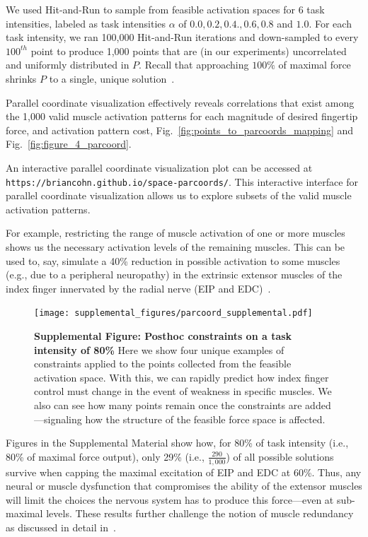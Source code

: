 \documentclass[9pt,twocolumn,twoside,lineno]{pnas-new}
\begin{document}
We used Hit-and-Run to sample from feasible activation spaces for 6 task intensities, labeled as task intensities $\alpha$ of $0.0, 0.2, 0.4., 0.6, 0.8$ and $1.0$.
For each task intensity, we ran 100,000 Hit-and-Run iterations and down-sampled to every $100^{th}$ point to produce 1,000 points that are (in our experiments) uncorrelated and uniformly distributed in $P$.
Recall that approaching $100\%$ of maximal force shrinks $P$ to a single, unique solution~\cite{Valero-Cuevas1998Large
}.




Parallel coordinate visualization effectively reveals correlations that exist among the 1,000 valid muscle activation patterns for each magnitude of desired fingertip force, and activation pattern cost, Fig.~\ref{fig:points_to_parcoords_mapping} and Fig.~\ref{fig:figure_4_parcoord}.


An interactive parallel coordinate visualization plot can be accessed at \texttt{https://briancohn.github.io/space-parcoords/}. This interactive interface for parallel coordinate visualization allows us to explore subsets of the valid muscle activation patterns.

For example, restricting the range of muscle activation of one or more muscles shows us the necessary activation levels of the remaining muscles.
This can be used to, say, simulate a 40\% reduction in possible activation to some muscles (e.g., due to a peripheral neuropathy) in the extrinsic extensor muscles of the index finger innervated by the radial nerve (EIP and EDC)~\cite{valero2000quantification}.

\begin{figure}[p]
 \centering
 \texttt{[image: supplemental\_figures/parcoord\_supplemental.pdf]}
 \caption{\textbf{Supplemental Figure: Posthoc constraints on a task intensity of 80\%} Here we show four unique examples of constraints applied to the points collected from the feasible activation space. With this, we can rapidly predict how index finger control must change in the event of weakness in specific muscles. We also can see how many points remain once the constraints are added—signaling how the structure of the feasible force space is affected.}
  \label{fig:parcoord_supplemental}
\end{figure}

Figures in the Supplemental Material show how, for 80\% of task intensity (i.e., 80\% of maximal force output), only 29\% (i.e., $\frac{290}{1,000}$) of all possible solutions survive when capping the maximal excitation of EIP and EDC at 60\%. Thus, any neural or muscle dysfunction that compromises the ability of the extensor muscles will limit the choices the nervous system has to produce this force---even at sub-maximal levels. These results further challenge the notion of muscle redundancy as discussed in detail in~\cite{kutch2011muscle,valero-cuevas2015fundamentals}.
\end{document}
